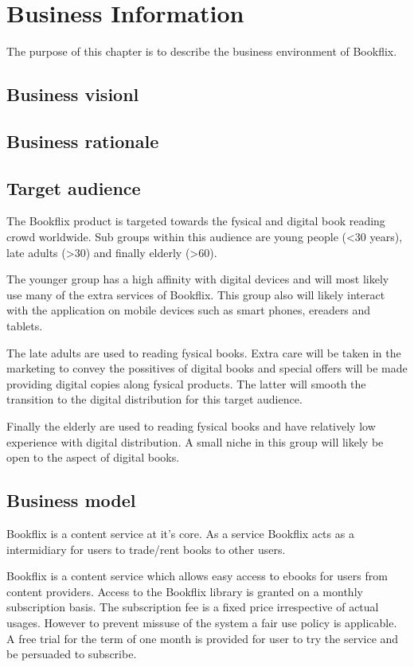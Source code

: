 \chapter*{Business Information}

The purpose of this chapter is to describe the business environment of Bookflix.

\section{Business visionl}
\section{Business rationale}


\section{Target audience}
The Bookflix product is targeted towards the fysical and digital book reading crowd worldwide. Sub groups within this audience are young people (<30 years), late adults (>30) and finally elderly (>60).

The younger group has a high affinity with digital devices and will most likely use many of the extra services of Bookflix.
This group also will likely interact with the application on mobile devices such as smart phones, ereaders and tablets.

The late adults are used to reading fysical books.
Extra care will be taken in the marketing to convey the possitives of digital books and special offers will be made providing digital copies along fysical products.
The latter will smooth the transition to the digital distribution for this target audience.

Finally the elderly are used to reading fysical books and have relatively low experience with digital distribution.
A small niche in this group will likely be open to the aspect of digital books.


\section{Business model}
Bookflix is a content service at it's core.
As a service Bookflix acts as a intermidiary for users to trade/rent books to other users.

Bookflix is a content service which allows easy access to ebooks for users from content providers.
Access to the Bookflix library is granted on a monthly subscription basis.
The subscription fee is a fixed price irrespective of actual usages.
However to prevent missuse of the system a fair use policy is applicable.
A free trial for the term of one month is provided for user to try the service and be persuaded to subscribe.

